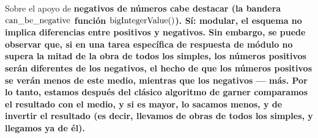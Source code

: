 Sobre el apoyo de \bf{negativos} de números cabe destacar (la bandera $\rm can\_be\_negative$ función ${\rm bigIntegerValue}()$). Sí: modular, el esquema no implica diferencias entre positivos y negativos. Sin embargo, se puede observar que, si en una tarea específica de respuesta de módulo no supera la mitad de la obra de todos los simples, los números positivos serán diferentes de los negativos, el hecho de que los números positivos se verán menos de este medio, mientras que los negativos --- más. Por lo tanto, estamos después del clásico algoritmo de garner comparamos el resultado con el medio, y si es mayor, lo sacamos menos, y de invertir el resultado (es decir, llevamos de obras de todos los simples, y llegamos ya de él).
